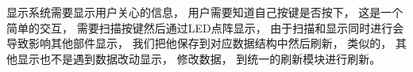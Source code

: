 \documentclass[../main.tex]{subfiles} %
\begin{document}
显示系统需要显示用户关心的信息，
用户需要知道自己按键是否按下，
这是一个简单的交互，
需要扫描按键然后通过LED点阵显示，
由于扫描和显示同时进行会导致影响其他部件显示，
我们把他保存到对应数据结构中然后刷新，
类似的，
其他显示也不是遇到数据改动显示，
修改数据，
到统一的刷新模块进行刷新。
\end{document}

